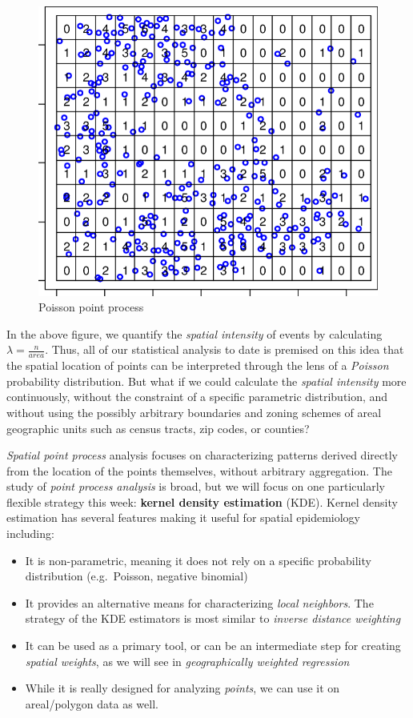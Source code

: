 \documentclass[
]{book}
\providecommand{\tightlist}{%
  \setlength{\itemsep}{0pt}\setlength{\parskip}{0pt}}
\begin{document}
\begin{figure}
\centering
\includegraphics{images/quadrat.png}
\caption{\label{fig:unnamed-chunk-125}Poisson point process}
\end{figure}

In the above figure, we quantify the \emph{spatial intensity} of events by calculating \(\lambda = \frac{n}{area}\). Thus, all of our statistical analysis to date is premised on this idea that the spatial location of points can be interpreted through the lens of a \emph{Poisson} probability distribution. But what if we could calculate the \emph{spatial intensity} more continuously, without the constraint of a specific parametric distribution, and without using the possibly arbitrary boundaries and zoning schemes of areal geographic units such as census tracts, zip codes, or counties?

\emph{Spatial point process} analysis focuses on characterizing patterns derived directly from the location of the points themselves, without arbitrary aggregation. The study of \emph{point process analysis} is broad, but we will focus on one particularly flexible strategy this week: \textbf{kernel density estimation} (KDE). Kernel density estimation has several features making it useful for spatial epidemiology including:

\begin{itemize}
\tightlist
\item
  It is non-parametric, meaning it does not rely on a specific probability distribution (e.g.~Poisson, negative binomial)
\item
  It provides an alternative means for characterizing \emph{local neighbors}. The strategy of the KDE estimators is most similar to \emph{inverse distance weighting}
\item
  It can be used as a primary tool, or can be an intermediate step for creating \emph{spatial weights}, as we will see in \emph{geographically weighted regression}
\item
  While it is really designed for analyzing \emph{points}, we can use it on areal/polygon data as well.
\end{itemize}
\end{document}
